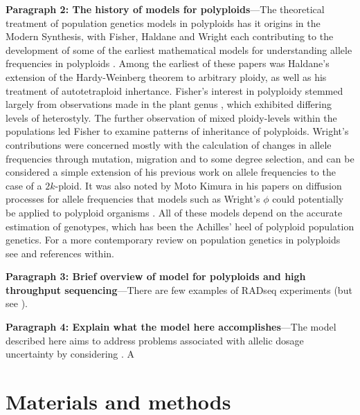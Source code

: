 \documentclass[11pt,english,letterpaper,oneside]{article}
\begin{document}
\textbf{Paragraph 2: The history of models for polyploids}---The theoretical treatment of population genetics models in polyploids has it origins in the Modern Synthesis, with  Fisher, Haldane and Wright each contributing to the development of some of the earliest mathematical models for understanding allele frequencies in polyploids \citep{haldane1930autopolyploids,wright1938polyploid,}. Among the earliest of these papers was Haldane's extension of the Hardy-Weinberg theorem to arbitrary ploidy, as well as his treatment of autotetraploid inhertance. Fisher's interest in polyploidy stemmed largely from observations made in the plant genus , which exhibited differing levels of heterostyly. The further observation of mixed ploidy-levels within the populations led Fisher to examine patterns of inheritance of polyploids. Wright's contributions were concerned mostly with the calculation of changes in allele frequencies through mutation, migration and to some degree selection, and can be considered a simple extension of his previous work on allele frequencies to the case of a $2k$-ploid. \cite{moody1993autopolyploids} It was also noted by Moto Kimura in his papers on diffusion processes for allele frequencies that models such as Wright's $\phi$ could potentially be applied to polyploid organisms \citep{kimura1964diffusion}. All of these models depend on the accurate estimation of genotypes, which has been the Achilles' heel of polyploid population genetics. For a more contemporary review on population genetics in polyploids see \cite{dufresne2014polyPopGen} and references within.
\medskip

\textbf{Paragraph 3: Brief overview of model for polyploids and high throughput sequencing}---There are few examples of RADseq experiments (but see \citep{logan-young2015polyploidSNP}).
\medskip

\textbf{Paragraph 4: Explain what the model here accomplishes}---The model described here aims to address problems associated with allelic dosage uncertainty by considering . A
\medskip

\section*{Materials and methods}                  %
\end{document}
